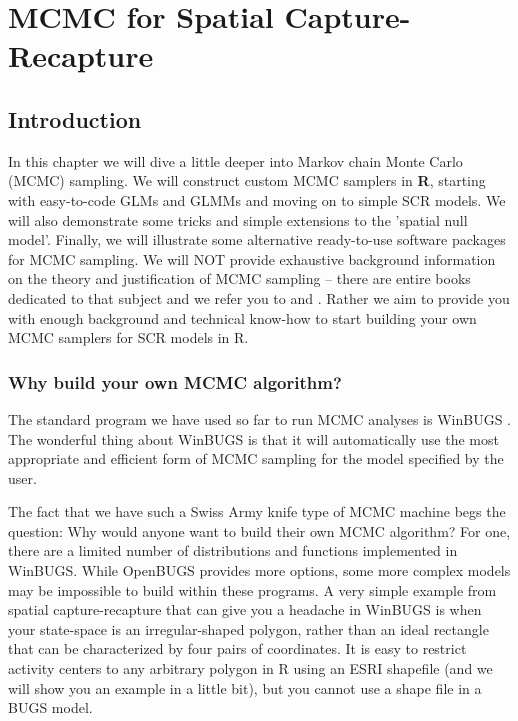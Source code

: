\chapter{
MCMC for Spatial Capture-Recapture
}
\label{chapt.mcmc}


\vspace{.3in}

\section{Introduction}
In this chapter we will dive a little deeper into Markov chain Monte
Carlo (MCMC) sampling. We will construct custom MCMC samplers in {\bf R},
starting with easy-to-code GLMs and GLMMs and moving on to simple SCR
models. We will also demonstrate some tricks and simple extensions to
the 'spatial null model'. Finally, we will illustrate some alternative
ready-to-use software packages for MCMC sampling. We will NOT provide
exhaustive background information on the theory and justification of
MCMC sampling – there are entire books dedicated to that subject and
we refer you to \citet{robert_casella:2004} and
\citet{robert_casella:2010}. Rather we aim to provide you with enough
background and technical know-how to start building your own MCMC
samplers for SCR models in R.



\subsection{Why build your own MCMC algorithm?}

The standard program we have used so far to run MCMC analyses is
WinBUGS \citep{gilks_etal:1994}. The wonderful thing about WinBUGS is
that it will automatically use the most appropriate and efficient form
of MCMC sampling for the model specified by the user.

The fact that we have such a Swiss Army knife type of MCMC machine
begs the question: Why would anyone want to build their own MCMC
algorithm? For one, there are a limited number of distributions and
functions implemented in WinBUGS. While OpenBUGS provides more
options, some more complex models may be impossible to build within
these programs. A very simple example from spatial capture-recapture
that can give you a headache in WinBUGS is when your state-space is an
irregular-shaped polygon, rather than an ideal rectangle that can be
characterized by four pairs of coordinates. It is easy to restrict
activity centers to any arbitrary polygon in R using an ESRI shapefile
(and we will show you an example in a little bit), but you cannot use
a shape file in a BUGS model.

